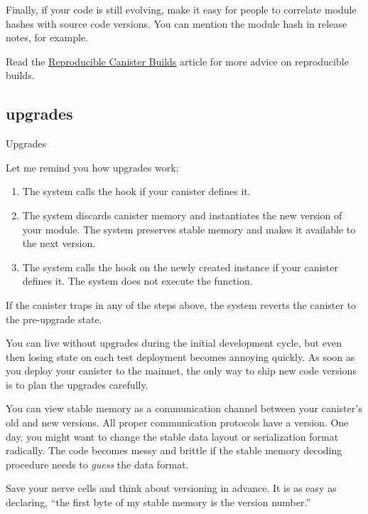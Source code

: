 \documentclass{article}
\begin{document}
Finally, if your code is still evolving, make it easy for people to correlate module hashes with source code versions.
You can mention the module hash in release notes, for example.

Read the \href{https://smartcontracts.org/docs/developers-guide/tutorials/reproducible-builds.html}{Reproducible Canister Builds} article for more advice on reproducible builds.

\subsection{upgrades}{Upgrades}

Let me remind you how upgrades work:
\begin{enumerate}
\item The system calls the  hook if your canister defines it.
\item 
  The system discards canister memory and instantiates the new version of your module.
  The system preserves stable memory and makes it available to the next version.
\item 
  The system calls the  hook on the newly created instance if your canister defines it.
  The system does not execute the  function.
\end{enumerate}

If the canister traps in any of the steps above, the system reverts the canister to the pre-upgrade state.


You can live without upgrades during the initial development cycle, but even then losing state on each test deployment becomes annoying quickly.
As soon as you deploy your canister to the mainnet, the only way to ship new code versions is to plan the upgrades carefully.


You can view stable memory as a communication channel between your canister's old and new versions.
All proper communication protocols have a version.
One day, you might want to change the stable data layout or serialization format radically.
The code becomes messy and brittle if the stable memory decoding procedure needs to \emph{guess} the data format.

Save your nerve cells and think about versioning in advance.
It is as easy as declaring, ``the first byte of my stable memory is the version number.''
\end{document}
